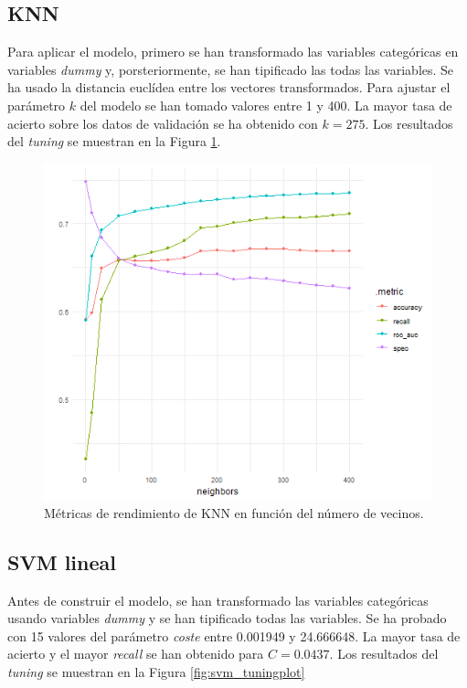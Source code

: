 \documentclass[12pt,a4paper,]{book}
\newcounter{dummy}
\numberwithin{dummy}{section}
\theoremstyle{ocrenumbox}
\theoremstyle{blacknumex}
\theoremstyle{blacknumbox}
\theoremstyle{ocrenum}
\theoremstyle{ocrenum}
\begin{document}
\hypertarget{knn}{%
\subsection{KNN}\label{knn}}

Para aplicar el modelo, primero se han transformado las variables
categóricas en variables \emph{dummy} y, porsteriormente, se han
tipificado las todas las variables. Se ha usado la distancia euclídea
entre los vectores transformados. Para ajustar el parámetro \(k\) del
modelo se han tomado valores entre 1 y 400. La mayor tasa de acierto
sobre los datos de validación se ha obtenido con \(k = 275\). Los
resultados del \emph{tuning} se muestran en la Figura
\ref{fig:knn_tuningplot}.

\begin{figure}[h]
\centering
\includegraphics[width =\textwidth]{graficos/knn_tuningplot.png}
\caption{Métricas de rendimiento de KNN en función del número de vecinos.}
\label{fig:knn_tuningplot}
\end{figure}

\hypertarget{svm-lineal}{%
\subsection{SVM lineal}\label{svm-lineal}}

Antes de construir el modelo, se han transformado las variables
categóricas usando variables \emph{dummy} y se han tipificado todas las
variables. Se ha probado con 15 valores del parámetro \emph{coste} entre
0.001949 y 24.666648. La mayor tasa de acierto y el mayor \emph{recall}
se han obtenido para \(C = 0.0437\). Los resultados del \emph{tuning} se
muestran en la Figura \ref{fig:svm_tuningplot}
\end{document}
